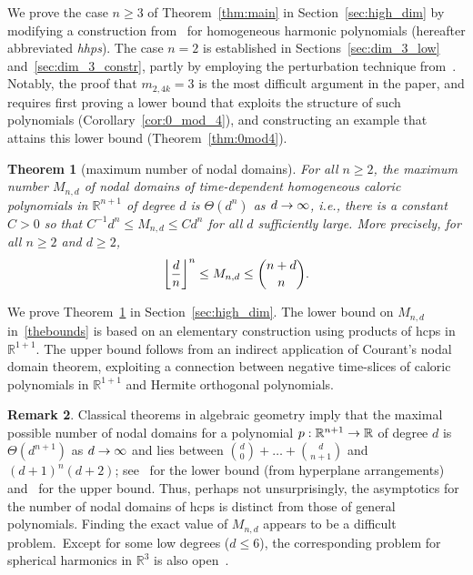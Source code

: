 \documentclass[10pt]{amsart}
\newtheorem{theo}{Theorem}[section]
\theoremstyle{definition}\newtheorem{defi}[theo]{Definition}\newtheorem{rema}[theo]{Remark}\newtheorem{exam}[theo]{Example}\newtheorem{exem}[theo]{Example}\newtheorem{nota}[theo]{Notation}
\newcommand{\R}{\mathbb{R}}
\renewcommand*{\to}{\mathchoice{\longrightarrow}{\rightarrow}{\rightarrow}{\rightarrow}}
\let\originalleft\left
\let\originalright\right
\renewcommand{\left}{\mathopen{}\mathclose\bgroup\originalleft}
\renewcommand{\right}{\aftergroup\egroup\originalright}
\begin{document}
We prove the case $n\geq 3$ of Theorem~\ref{thm:main} in Section~\ref{sec:high_dim} by modifying a construction from~\cite{BET17} for homogeneous harmonic polynomials (hereafter abbreviated \emph{hhps}). The case $n=2$ is established in Sections~\ref{sec:dim_3_low} and~\ref{sec:dim_3_constr}, partly by employing the perturbation technique from~\cite{Lewy77}. Notably, the proof that $m_{2,4k}=3$ is the most difficult argument in the paper, and requires first proving a lower bound that exploits the structure of such polynomials (Corollary~\ref{cor:0_mod_4}), and constructing an example that attains this lower bound (Theorem~\ref{thm:0mod4}).


\begin{theo}[maximum number of nodal domains] \label{thm:max-asymptotics}
For all $n\geq 2$, the maximum number $M_{n,d}$ of nodal domains of time-dependent homogeneous caloric polynomials in $\R^{n+1}$ of degree $d$ is $\Theta(d^n)$ as $d\to\infty$, i.e., there is a constant $C >0 $ so that $C^{-1} d^n \le M_{n,d} \le C d^n$ for all $d$ sufficiently large. More precisely, for all $n\geq 2$ and $d\geq 2$,
\begin{equation}
\left\lfloor \frac{d}{n}\right\rfloor^n \le M_{n,d} \le \binom{n+d}{n}. \label{thebounds}
\end{equation}
\end{theo}


We prove Theorem~\ref{thm:max-asymptotics} in Section~\ref{sec:high_dim}. The lower bound on $M_{n,d}$ in~\eqref{thebounds} is based on an elementary construction using products of hcps in $\R^{1+1}$. The upper bound follows from an indirect application of Courant's nodal domain theorem, exploiting a connection between negative time-slices of caloric polynomials in $\R^{1+1}$ and Hermite orthogonal polynomials.

\begin{rema}
Classical theorems in algebraic geometry imply that the maximal {possible} number of nodal domains {for a} polynomial $p:\R^{n+1}\to\R$ of degree $d$ is $\Theta(d^{n+1})$ as $d\to\infty$ and lies between $\binom{d}{0}+\dots+\binom{d}{n+1}$ and $(d+1)^n(d+2)$; see~\cite[Proposition~2.4]{stanley-parkcity} for the lower bound (from hyperplane arrangements) and~\cite[Theorem~3]{M64} for the upper bound. Thus, perhaps not unsurprisingly, the {asymptotics for the number of nodal domains of }hcps is distinct from those of general polynomials. Finding the exact value of $M_{n,d}$ appears to be a difficult problem.~Except for some low degrees ($d\leq 6$), the corresponding problem for spherical harmonics in $\R^3$ is also open~\cite{Leydold96}.
\end{rema}
\end{document}
